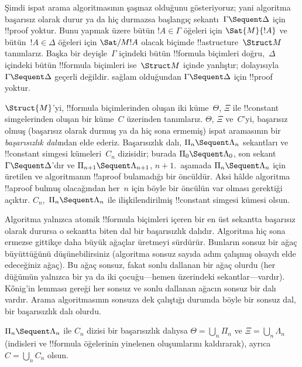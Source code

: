 



Şimdi ispat arama algoritmasının şaşmaz olduğunu gösteriyoruz; yani algoritma
başarısız olarak durur ya da hiç durmazsa başlangıç sekantı~$\Gamma \Sequent
\Delta$ için !!{proof} yoktur. Bunu yapmak üzere bütün $!A \in \Gamma$
öğeleri için $\Sat{M}{!A}$ ve bütün~$!A \in \Delta$ öğeleri için
$\Sat/{M}{!A}$ olacak biçimde !!a{structure}~$\Struct M$ tanımlarız. Başka
bir deyişle~$\Gamma$ içindeki bütün !!{formula} biçimleri doğru,~$\Delta$ içindeki
bütün !!{formula} biçimleri ise~$\Struct M$ içinde yanlıştır; dolayısıyla $\Gamma
\Sequent \Delta$ geçerli değildir.  sağlam olduğundan $\Gamma
\Sequent \Delta$ için !!{proof} yoktur.

$\Struct{M}$'yi, !!{formula} biçimlerinden oluşan iki küme~$\Theta$, $\Xi$ ile
!!{constant} simgelerinden oluşan bir küme~$C$ üzerinden tanımlarız. $\Theta$, $\Xi$ ve~$C$'yi,
başarısız olmuş (başarısız olarak durmuş ya da hiç sona ermemiş) ispat
aramasının bir \emph{başarısızlık dalı}ndan elde ederiz. Başarısızlık dalı,
$\Pi_n \Sequent \Lambda_n$ sekantları ve !!{constant} simgesi kümeleri~$C_n$
dizisidir; burada $\Pi_0 \Sequent \Lambda_0$, son sekant~$\Gamma \Sequent
\Delta$'dır ve $\Pi_{n+1} \Sequent \Lambda_{n+1}$, $n+1$.~aşamada $\Pi_n
\Sequent \Lambda_n$ için üretilen ve algoritmanın !!a{proof} bulamadığı bir
öncüldür. Aksi hâlde algoritma !!a{proof} bulmuş olacağından her~$n$ için
böyle bir öncülün var olması gerektiği açıktır. $C_n$,~$\Pi_n \Sequent
\Lambda_n$ ile ilişkilendirilmiş !!{constant} simgesi kümesi olsun.

Algoritma yalnızca atomik !!{formula} biçimleri içeren bir en üst sekantta başarısız
olarak durursa o sekantta biten dal bir başarısızlık dalıdır. Algoritma hiç
sona ermezse gittikçe daha büyük ağaçlar üretmeyi sürdürür. Bunların sonsuz
bir ağaç büyüttüğünü düşünebilirsiniz (algoritma sonsuz sayıda adım çalışmış
olsaydı elde edeceğiniz ağaç). Bu ağaç sonsuz, fakat sonlu dallanan bir ağaç
olurdu (her düğümün yalnızca bir ya da iki çocuğu---hemen üzerindeki
sekantlar---vardır). K\H{o}nig'in lemması gereği her sonsuz ve sonlu dallanan
ağacın sonsuz bir dalı vardır. Arama algoritmasının sonsuza dek çalıştığı
durumda böyle bir sonsuz dal, bir başarısızlık dalı olurdu.

$\Pi_n \Sequent \Lambda_n$ ile $C_n$ dizisi bir başarısızlık dalıysa
$\Theta = \bigcup_n \Pi_n$ ve $\Xi = \bigcup_n \Lambda_n$ (indisleri ve
!!{formula} öğelerinin yinelenen oluşumlarını kaldırarak), ayrıca $C =
\bigcup_n C_n$ olsun.

